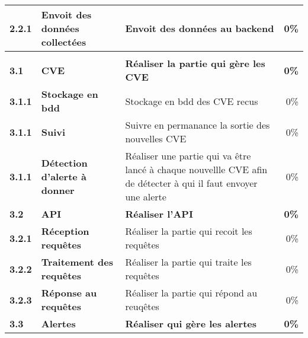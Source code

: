 \begin{tabular}{|l|l|>{\raggedright}p{5cm}|r|}
  \hspace{6pt} \bfseries{2.2.1}  & \bfseries{Envoit des données collectées} & Envoit des données au backend & 0\% \\
  \hline


  \rowcolor{myBlue} \color{White}{\bfseries 3}  & \color{White}{\bfseries Backend} & \color{White}{\bfseries Réaliser un backend} & \color{White}{\bfseries 0\%} \\
  \hline

  \rowcolor{lightGray} \bfseries{3.1}  & \bfseries{CVE} & \bfseries{Réaliser la partie qui gère les CVE} & \bfseries{0\%} \\
  \hline

  \hspace{6pt} \bfseries{3.1.1}  & \bfseries{Stockage en bdd} & Stockage en bdd des CVE recus & 0\% \\
  \hline

  \hspace{6pt} \bfseries{3.1.1}  & \bfseries{Suivi} & Suivre en permanance la sortie des nouvelles CVE  & 0\% \\
  \hline

  \hspace{6pt} \bfseries{3.1.1}  & \bfseries{Détection d'alerte à donner} & Réaliser une partie qui va être lancé à chaque nouvellle CVE afin de détecter à qui il faut envoyer une alerte & 0\% \\
  \hline


  \rowcolor{lightGray} \bfseries{3.2}  & \bfseries{API} & \bfseries{Réaliser l'API} & \bfseries{0\%} \\
  \hline

  \hspace{6pt} \bfseries{3.2.1}  & \bfseries{Réception requêtes} & Réaliser la partie qui recoit les requêtes & 0\% \\
  \hline

  \hspace{6pt} \bfseries{3.2.2}  & \bfseries{Traitement des requêtes} & Réaliser la partie qui traite les requêtes  & 0\% \\
  \hline

  \hspace{6pt} \bfseries{3.2.3}  & \bfseries{Réponse au requêtes} & Réaliser la partie qui répond au reuqêtes & 0\% \\
  \hline


  \rowcolor{lightGray} \bfseries{3.3}  & \bfseries{Alertes} & \bfseries{Réaliser qui gère les alertes} & \bfseries{0\%} \\
  \hline


\end{tabular}
